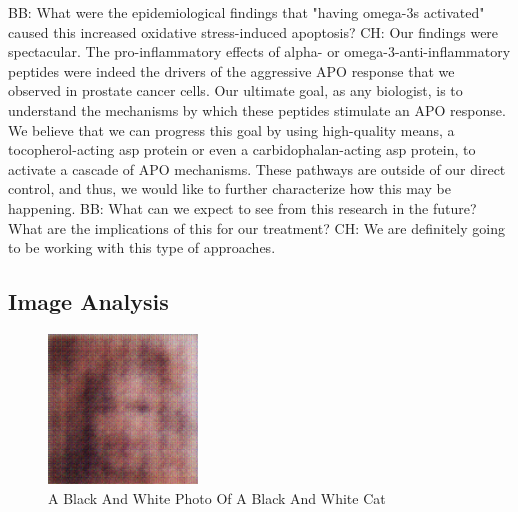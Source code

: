 \documentclass{article}%
\begin{document}
BB: What were the epidemiological findings that "having omega{-}3s activated" caused this increased oxidative stress{-}induced apoptosis?\newline%
CH: Our findings were spectacular. The pro{-}inflammatory effects of alpha{-} or omega{-}3{-}anti{-}inflammatory peptides were indeed the drivers of the aggressive APO response that we observed in prostate cancer cells. Our ultimate goal, as any biologist, is to understand the mechanisms by which these peptides stimulate an APO response. We believe that we can progress this goal by using high{-}quality means, a tocopherol{-}acting asp protein or even a carbidophalan{-}acting asp protein, to activate a cascade of APO mechanisms. These pathways are outside of our direct control, and thus, we would like to further characterize how this may be happening.\newline%
BB: What can we expect to see from this research in the future? What are the implications of this for our treatment?\newline%
CH: We are definitely going to be working with this type of approaches.

%
\subsection{Image Analysis}%
\label{subsec:ImageAnalysis}%


\begin{figure}[h!]%
\centering%
\includegraphics[width=150px]{500_fake_images/samples_5_202.png}%
\caption{A Black And White Photo Of A Black And White Cat}%
\end{figure}

%
\end{document}
